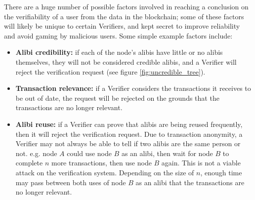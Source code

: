 There are a huge number of possible factors involved in reaching a conclusion on the verifiability of a user from the data in the blockchain; some of these factors will likely be unique to certain Verifiers, and kept secret to improve reliability and avoid gaming by malicious users. Some simple example factors include:
\begin{itemize}
	\item \textbf{Alibi credibility:} if each of the node’s alibis have little or no alibis themselves, they will not be considered credible alibis, and a Verifier will reject the verification request (see figure \ref{fig:uncredible_tree}).
	\item \textbf{Transaction relevance:} if a Verifier considers the transactions it receives to be out of date, the request will be rejected on the grounds that the transactions are no longer relevant.
	\item \textbf{Alibi reuse:} if a Verifier can prove that alibis are being reused frequently, then it will reject the verification request. Due to transaction anonymity, a Verifier may not always be able to tell if two alibis are the same person or not. e.g. node $A$ could use node $B$ as an alibi, then wait for node $B$ to complete $n$ more transactions, then use node $B$ again.
	This is not a viable attack on the verification system. Depending on the size of $n$, enough time may pass between both uses of node $B$ as an alibi that the transactions are no longer relevant.
\end{itemize}